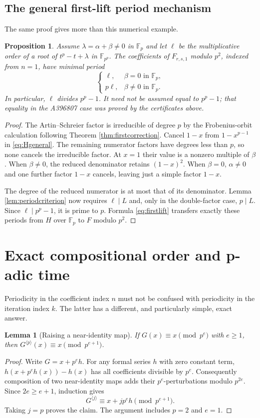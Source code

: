\documentclass[11pt,letterpaper]{article}
\newtheorem{lemma}[theorem]{Lemma}
\newtheorem{proposition}[theorem]{Proposition}
\theoremstyle{definition}
\theoremstyle{remark}
\newcommand{\F}{\mathbb F}
\newcommand{\iter}[2]{#1^{\langle #2\rangle}}
\begin{document}
\subsection{The general first-lift period mechanism}
The same proof gives more than this numerical example.

\begin{proposition}\label{prop:generalperiod}
Assume $\lambda=\alpha+\beta\ne0$ in $\F_p$ and let $\ell$ be the
multiplicative order of a root of $t^p-t+\lambda$ in $\F_{p^p}$.
The coefficients of $F_{r,s,1}$ modulo $p^2$, indexed from $n=1$,
have minimal period
\[
 \begin{cases}
 \ell,&\beta=0\text{ in }\F_p,\\
 p\ell,&\beta\ne0\text{ in }\F_p.
 \end{cases}
\]
In particular, $\ell$ divides $p^p-1$.  It need not be assumed equal
to $p^p-1$; that equality in the A396807 case was proved by the
certificates above.
\end{proposition}
\begin{proof}
The Artin--Schreier factor is irreducible of degree $p$ by the
Frobenius-orbit calculation following Theorem \ref{thm:firstcorrection}.
Cancel $1-x$ from $1-x^{p-1}$ in \eqref{eq:Hgeneral}.  The remaining
numerator factors have degrees less than $p$, so none cancels the
irreducible factor.  At $x=1$ their value is a nonzero multiple of
$\beta$.  When $\beta\ne0$, the reduced denominator retains
$(1-x)^2$.  When $\beta=0$, $\alpha\ne0$ and one further factor $1-x$
cancels, leaving just a simple factor $1-x$.

The degree of the reduced numerator is at most that of its denominator.
Lemma \ref{lem:periodcriterion} now requires $\ell\mid L$ and, only in
the double-factor case, $p\mid L$.  Since $\ell\mid p^p-1$, it is prime
to $p$.  Formula \eqref{eq:firstlift} transfers exactly these periods
from $H$ over $\F_p$ to $F$ modulo $p^2$.
\end{proof}

\section{Exact compositional order and p-adic time}\label{sec:orders}

Periodicity in the coefficient index $n$ must not be confused with
periodicity in the iteration index $k$.  The latter has a different,
and particularly simple, exact answer.

\begin{lemma}[Raising a near-identity map]\label{lem:nearid}
If $G(x)\equiv x\pmod {p^e}$ with $e\geq1$, then
$\iter{G}{p}(x)\equiv x\pmod {p^{e+1}}$.
\end{lemma}
\begin{proof}
Write $G=x+p^e h$.  For any formal series $h$ with zero constant term,
$h(x+p^e h(x))-h(x)$ has all coefficients divisible by $p^e$.
Consequently composition of two near-identity maps adds their
$p^e$-perturbations modulo $p^{2e}$.  Since $2e\geq e+1$, induction gives
\[
 \iter{G}{j}\equiv x+jp^e h\pmod {p^{e+1}}.
\]
Taking $j=p$ proves the claim.  The argument includes $p=2$ and $e=1$.
\end{proof}
\end{document}
